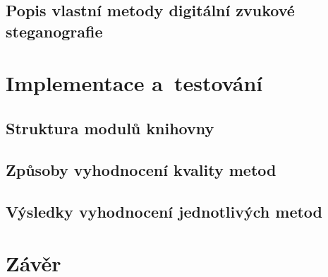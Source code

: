 
\blindtext

\blindtext

\section{Popis vlastní metody digitální zvukové steganografie}
\label{sec:own-method}


\blindtext

\blindtext


\chapter{Implementace a~testování}
\label{cha:implementation}


\blindtext

\section{Struktura modulů knihovny}
\label{sec:modules}


\blindtext

\blindtext

\blindtext

\section{Způsoby vyhodnocení kvality metod}
\label{sec:method-quality}


\blindtext

\blindtext

\blindtext

\section{Výsledky vyhodnocení jednotlivých metod}
\label{sec:method-evaluation}


\blindtext

\blindtext

\blindtext


\chapter{Závěr}
\label{cha:conclusion}

\blindtext

\blindtext

\blindtext
